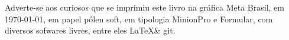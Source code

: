 \pagebreak

\ifodd\thepage\blankpage\fi

\parindent=0pt
\footnotesize\thispagestyle{empty}








\mbox{}\vfill


\begin{center}
		\begin{minipage}{.75\textwidth}\tiny\noindent{}
		\centering\tiny
		Adverte-se aos curiosos que se imprimiu este 
		livro na gráfica Meta Brasil, 
		em \today, em papel pólen soft, em tipologia MinionPro e Formular, 
		com diversos sofwares livres, 
		entre eles \LaTeX \& git. \medskip\\\
		\end{minipage}
\end{center}